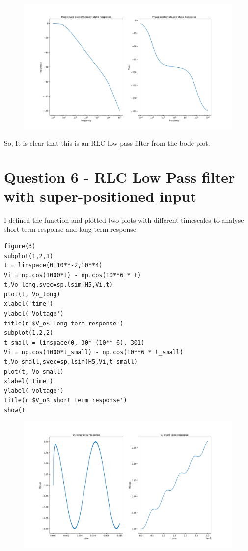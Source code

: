 \documentclass[12pt, a4paper]{report}
\begin{document}
\begin{figure}[!tbh]
   	\centering
   	\includegraphics[scale=0.5]{Q5.png}
 \end{figure} 
 
 
 So, It is clear that this is an RLC low pass filter from the bode plot.
 \section*{Question 6 - RLC Low Pass filter with super-positioned input }

I defined the function and plotted two plots with different timescales to analyse short term response and long term response

\begin{Verbatim}
figure(3)
subplot(1,2,1)
t = linspace(0,10**-2,10**4)
Vi = np.cos(1000*t) - np.cos(10**6 * t)
t,Vo_long,svec=sp.lsim(H5,Vi,t)
plot(t, Vo_long)
xlabel('time')
ylabel('Voltage')
title(r'$V_o$ long term response')
subplot(1,2,2)
t_small = linspace(0, 30* (10**-6), 301)
Vi = np.cos(1000*t_small) - np.cos(10**6 * t_small)
t,Vo_small,svec=sp.lsim(H5,Vi,t_small)
plot(t, Vo_small)
xlabel('time')
ylabel('Voltage')
title(r'$V_o$ short term response')
show()
\end{Verbatim}

\begin{figure}[!tbh]
   	\centering
   	\includegraphics[scale=0.5]{Q6.png}
 \end{figure} 
 
\end{document}
